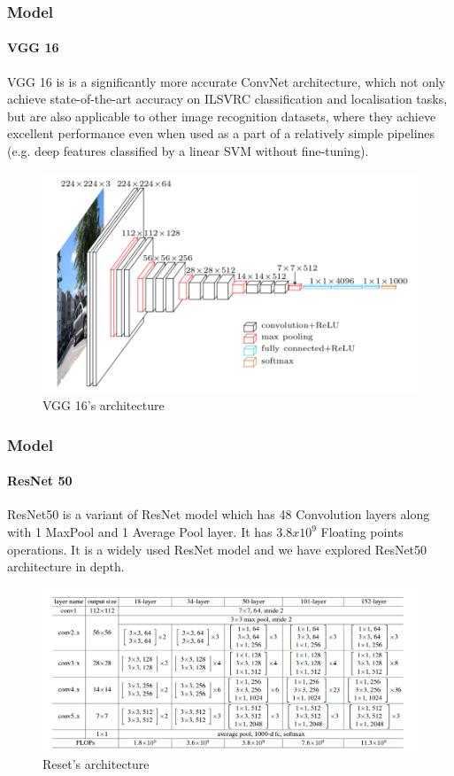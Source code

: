 \documentclass[10pt, aspectratio=169]{beamer}
\begin{document}
	\begin{frame}
		\frametitle{Model}
		\framesubtitle{VGG 16}

		VGG 16 is is a significantly more accurate ConvNet architecture, which
		not only achieve state-of-the-art accuracy on ILSVRC classification and
		localisation tasks, but are also applicable to other image recognition
		datasets, where they achieve excellent performance even when used as a
		part of a relatively simple pipelines (e.g. deep features classified by
		a linear SVM without fine-tuning).
	\end{frame}

	\begin{frame}
		\begin{figure}[h]
			\centering
			\includegraphics[width=0.8\linewidth]{imgs/vgg16_arch.png}
			\caption{VGG 16's architecture}%
			\label{fig:imgs/vgg16_arch}
		\end{figure}
	\end{frame}

	\begin{frame}
		\frametitle{Model}
		\framesubtitle{ResNet 50}

		ResNet50 is a variant of ResNet model which has 48 Convolution layers
		along with 1 MaxPool and 1 Average Pool layer. It has $3.8 x 10^9$
		Floating points operations. It is a widely used ResNet model and we have
		explored ResNet50 architecture in depth.
	\end{frame}

	\begin{frame}
		\begin{figure}[h]
			\centering
			\includegraphics[width=\linewidth]{imgs/resnet_arch.png}
			\caption{Reset's architecture}%
			\label{fig:imgs/resnet_arch2}
		\end{figure}
	\end{frame}
\end{document}
